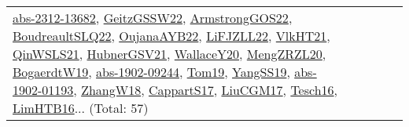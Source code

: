 {\begin{longtable}{lp{3cm}>{\raggedright}p{6cm}>{\raggedright}p{6cm}p{8cm}}
\href{articles/abs-2312-13682.pdf}{abs-2312-13682}\cite{abs-2312-13682}, \href{papers/GeitzGSSW22.pdf}{GeitzGSSW22}\cite{GeitzGSSW22}, \href{papers/ArmstrongGOS22.pdf}{ArmstrongGOS22}\cite{ArmstrongGOS22}, \href{papers/BoudreaultSLQ22.pdf}{BoudreaultSLQ22}\cite{BoudreaultSLQ22}, \href{papers/OujanaAYB22.pdf}{OujanaAYB22}\cite{OujanaAYB22}, \href{papers/LiFJZLL22.pdf}{LiFJZLL22}\cite{LiFJZLL22}, \href{articles/VlkHT21.pdf}{VlkHT21}\cite{VlkHT21}, \href{articles/QinWSLS21.pdf}{QinWSLS21}\cite{QinWSLS21}, \href{articles/HubnerGSV21.pdf}{HubnerGSV21}\cite{HubnerGSV21}, \href{articles/WallaceY20.pdf}{WallaceY20}\cite{WallaceY20}, \href{articles/MengZRZL20.pdf}{MengZRZL20}\cite{MengZRZL20}, \href{papers/BogaerdtW19.pdf}{BogaerdtW19}\cite{BogaerdtW19}, \href{articles/abs-1902-09244.pdf}{abs-1902-09244}\cite{abs-1902-09244}, \href{papers/Tom19.pdf}{Tom19}\cite{Tom19}, \href{papers/YangSS19.pdf}{YangSS19}\cite{YangSS19}, \href{articles/abs-1902-01193.pdf}{abs-1902-01193}\cite{abs-1902-01193}, \href{articles/ZhangW18.pdf}{ZhangW18}\cite{ZhangW18}, \href{papers/CappartS17.pdf}{CappartS17}\cite{CappartS17}, \href{papers/LiuCGM17.pdf}{LiuCGM17}\cite{LiuCGM17}, \href{papers/Tesch16.pdf}{Tesch16}\cite{Tesch16}, \href{papers/LimHTB16.pdf}{LimHTB16}\cite{LimHTB16}... (Total: 57)\\

\end{longtable}}
